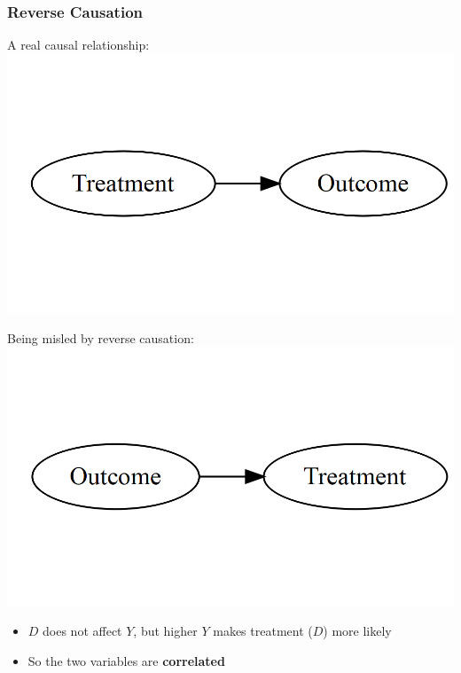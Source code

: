 \documentclass[xcolor=x11names,compress]{beamer}\usepackage[]{graphicx}\usepackage[]{xcolor}
\makeatletter
\def\maxwidth{ %
  \ifdim\Gin@nat@width>\linewidth
    \linewidth
  \else
    \Gin@nat@width
  \fi
}
\newenvironment{knitrout}{}{} %
\renewcommand{\(}{\begin{columns}}
\renewcommand{\)}{\end{columns}}
\newcommand{\<}[1]{\begin{column}{#1}}
\renewcommand{\>}{\end{column}}
\makeatother
\begin{document}
\begin{frame}
\frametitle{Reverse Causation}
\begin{multicols}{2}
A real causal relationship:
\begin{knitrout}
\color{fgcolor}
\includegraphics[width=\maxwidth]{figure/explanation5-1} 
\end{knitrout}
\columnbreak

\pause
Being misled by reverse causation:
\begin{knitrout}
\color{fgcolor}
\includegraphics[width=\maxwidth]{figure/explanation6-1} 
\end{knitrout}
\end{multicols}
\begin{itemize}
\pause
\item $D$ does not affect $Y$, but higher $Y$ makes treatment ($D$) more likely
\pause
\item So the two variables are \textbf{correlated}
\end{itemize}
\end{frame}
\end{document}

